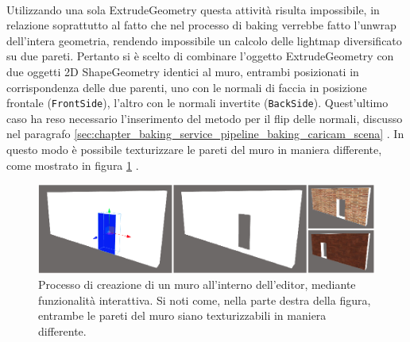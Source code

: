 \\
Utilizzando una sola ExtrudeGeometry questa attività risulta impossibile, in relazione soprattutto al fatto che nel processo di baking verrebbe fatto l’unwrap dell’intera geometria, rendendo impossibile un calcolo delle lightmap diversificato su due pareti.
Pertanto si è scelto di combinare l’oggetto ExtrudeGeometry con due oggetti 2D ShapeGeometry identici al muro, entrambi posizionati in corrispondenza delle due parenti, uno con le normali di faccia in posizione frontale (\texttt{FrontSide}), l’altro con le normali invertite (\texttt{BackSide}). Quest’ultimo caso ha reso necessario l’inserimento del metodo per il flip delle normali, discusso nel paragrafo \ref{sec:chapter_baking_service_pipeline_baking_caricam_scena} . In questo modo è possibile texturizzare le pareti del muro in maniera differente, come mostrato in figura \ref{fig:editor_3} .
\\
\begin{figure}[h]
 \centering
 \includegraphics[width=1\linewidth]{images/chapter_creazione_scena/editor_3.png}\hfill
 \caption[Creazione muri]{Processo di creazione di un muro all'interno dell'editor, mediante funzionalità interattiva. Si noti come, nella parte destra della figura, entrambe le pareti del muro siano texturizzabili in maniera differente.}
 \label{fig:editor_3}
\end{figure}
\newpage
